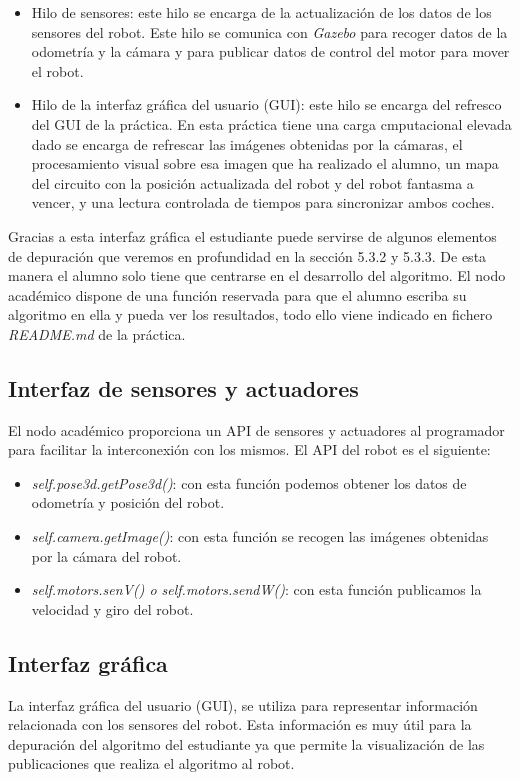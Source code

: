 \begin{itemize}
	\item Hilo de sensores: este hilo se encarga de la actualización de los datos de los sensores del robot. Este hilo se comunica con \textit{Gazebo} para recoger datos de la odometría y la cámara y para publicar datos de control del motor para mover el robot.
	\item Hilo de la interfaz gráfica del usuario (GUI): este hilo se encarga del refresco del GUI de la práctica. En esta práctica tiene una carga cmputacional elevada dado se encarga de refrescar las imágenes obtenidas por la cámaras, el procesamiento visual sobre esa imagen que ha realizado el alumno, un mapa del circuito con la posición actualizada del robot y del robot fantasma a vencer, y una lectura controlada de tiempos para sincronizar ambos coches.
\end{itemize}

Gracias a esta interfaz gráfica el estudiante puede servirse de algunos elementos de depuración que veremos en profundidad en la sección 5.3.2 y 5.3.3. De esta manera el alumno solo tiene que centrarse en el desarrollo del algoritmo. El nodo académico dispone de una función reservada para que el alumno escriba su algoritmo en ella y pueda ver los resultados, todo ello viene indicado en fichero \textit{README.md} de la práctica.

\subsection{Interfaz de sensores y actuadores}
El nodo académico proporciona un API de sensores y actuadores al programador para facilitar la interconexión con los mismos. El API del robot es el siguiente:

\begin{itemize}
	\item \textit{self.pose3d.getPose3d()}: con esta función podemos obtener los datos de odometría y posición del robot.
	\item \textit{self.camera.getImage()}: con esta función se recogen las imágenes obtenidas por la cámara del robot.
	\item \textit{self.motors.senV() o self.motors.sendW()}: con esta función publicamos la velocidad y giro del robot.
\end{itemize}

\subsection{Interfaz gráfica}
La interfaz gráfica del usuario (GUI), se utiliza para representar información relacionada con los sensores del robot. Esta información es muy útil para la depuración del algoritmo del estudiante ya que permite la visualización de las publicaciones que realiza el algoritmo al robot.



